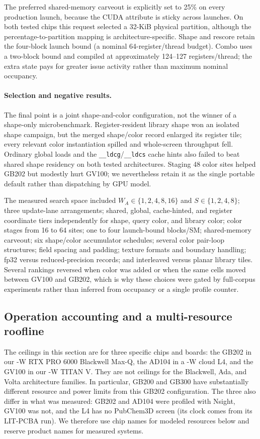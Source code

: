 The preferred shared-memory carveout is explicitly set to 25\% on every
production launch, because the CUDA attribute is sticky across launches. On
both tested chips this request selected a 32-KiB physical partition, although
the percentage-to-partition mapping is architecture-specific. Shape and
rescore retain the four-block launch bound (a nominal 64-register/thread
budget). Combo uses a two-block bound and compiled at approximately 124--127
registers/thread; the extra state pays for greater issue activity rather than
maximum nominal occupancy.

\paragraph{Selection and negative results.}
The final point is a joint shape-and-color configuration, not the winner of a
shape-only microbenchmark. Register-resident library shape won an isolated
shape campaign, but the merged shape/color record enlarged its register tile;
every relevant color instantiation spilled and whole-screen throughput fell.
Ordinary global loads and the \texttt{\_\_ldcg}/\texttt{\_\_ldcs} cache hints also
failed to beat shared shape residency on both tested architectures. Staging 48
color sites helped GB202 but modestly hurt GV100; we nevertheless retain it as
the single portable default rather than dispatching by GPU model.

The measured search space included $W_A\in\{1,2,4,8,16\}$ and
$S\in\{1,2,4,8\}$; three update-lane arrangements; shared, global, cache-hinted,
and register coordinate tiers independently for shape, query color, and
library color; color stages from 16 to 64 sites; one to four launch-bound
blocks/SM; shared-memory carveout; six shape/color accumulator schedules;
several color pair-loop structures; field spacing and padding; texture formats
and boundary handling; fp32 versus reduced-precision records; and interleaved
versus planar library tiles. Several rankings reversed when color was added or
when the same cells moved between GV100 and GB202, which is why these choices
were gated by full-corpus experiments rather than inferred from occupancy or a
single profile counter.


\subsection{Operation accounting and a multi-resource roofline}
\label{app:roofline}

The ceilings in this section are for three specific chips and boards: the GB202
in our \RooflineBlackwellPowerLimitW-W RTX PRO 6000 Blackwell Max-Q, the AD104 in a \RooflineLFourPowerLimitW-W cloud L4, and the
GV100 in our \RooflineTitanPowerLimitW-W TITAN V. They are not ceilings for the Blackwell, Ada, and
Volta architecture families. In particular, GB200 and GB300 have substantially
different resource and power limits from this GB202 configuration. The three
also differ in what was measured: GB202 and AD104 were profiled with Nsight,
GV100 was not, and the L4 has no PubChem3D screen (its clock comes from its
LIT-PCBA run). We therefore use chip names for modeled
resources below and reserve product names for measured systems.

